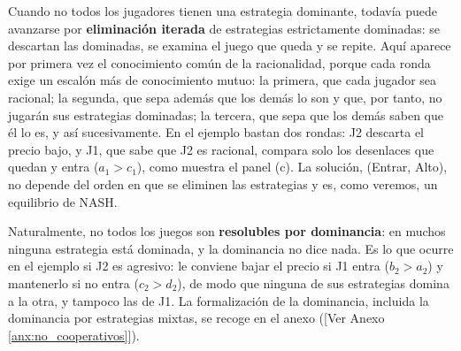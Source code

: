 \documentclass[10pt,a4paper]{article}
\newcommand{\authorfont}[1]{{\fontfamily{EBGaramond-TLF}\selectfont #1}}
\newcounter{anexo}
\begin{document}
Cuando no todos los jugadores tienen una estrategia dominante, todavía puede avanzarse por \textbf{eliminación iterada} de estrategias estrictamente dominadas: se descartan las dominadas, se examina el juego que queda y se repite. Aquí aparece por primera vez el conocimiento común de la racionalidad, porque cada ronda exige un escalón más de conocimiento mutuo: la primera, que cada jugador sea racional; la segunda, que sepa además que los demás lo son y que, por tanto, no jugarán sus estrategias dominadas; la tercera, que sepa que los demás saben que él lo es, y así sucesivamente. En el ejemplo bastan dos rondas: J2 descarta el precio bajo, y J1, que sabe que J2 es racional, compara solo los desenlaces que quedan y entra ($a_1>c_1$), como muestra el panel (c). La solución, (Entrar, Alto), no depende del orden en que se eliminen las estrategias y es, como veremos, un equilibrio de NASH.

Naturalmente, no todos los juegos son \textbf{resolubles por dominancia}: en muchos ninguna estrategia está dominada, y la dominancia no dice nada. Es lo que ocurre en el ejemplo si J2 es agresivo: le conviene bajar el precio si J1 entra ($b_2>a_2$) y mantenerlo si no entra ($c_2>d_2$), de modo que ninguna de sus estrategias domina a la otra, y tampoco las de J1. La formalización de la dominancia, incluida la dominancia por estrategias mixtas, se recoge en el anexo ([\authorfont{Ver Anexo \ref{anx:no_cooperativos}}]).
\end{document}
